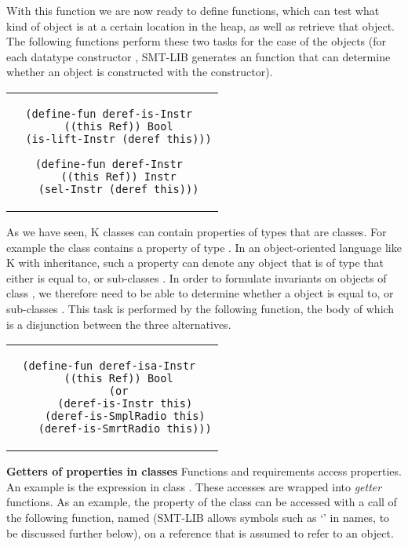 \noindent With this function we are now ready to define functions,
which can test what kind of object is at a certain location in the
heap, as well as retrieve that object. The following functions perform
these two tasks for the case of the  objects (for
each datatype constructor , SMT-LIB generates an 
function that can determine whether an object is constructed with the
constructor).

\begin{center}
\begin{tabular}{c}
\small
\begin{lstlisting}
(define-fun deref-is-Instr 
  ((this Ref)) Bool
  (is-lift-Instr (deref this)))

(define-fun deref-Instr 
  ((this Ref)) Instr
  (sel-Instr (deref this)))
\end{lstlisting}
\end{tabular}
\end{center}

\noindent As we have seen, K classes can contain properties of types
that are classes. For example the  class contains a
property  of type . In an object-oriented
language like K with inheritance, such a property can denote any
object that is of type that either is equal to, or sub-classes
. In order to formulate invariants on objects of
class , we therefore need to be able to determine
whether a  object is equal to, or sub-classes
. This task is performed by the following function,
the body of which is a disjunction between the three alternatives.

\begin{center}
\begin{tabular}{c}
\small
\begin{lstlisting}
(define-fun deref-isa-Instr 
  ((this Ref)) Bool
  (or
    (deref-is-Instr this)
    (deref-is-SmplRadio this)
    (deref-is-SmrtRadio this)))
\end{lstlisting}
\end{tabular}
\end{center}

\textbf{Getters of properties in classes} Functions and requirements
access properties. An example is the expression  in
class .  These accesses are wrapped into {\em getter}
functions. As an example, the  property of the class
 can be accessed with a call of the following
function, named  (SMT-LIB allows symbols such
as `\code{!}'  in names, to be discussed further below), on a
reference that is assumed to refer to an  object.

